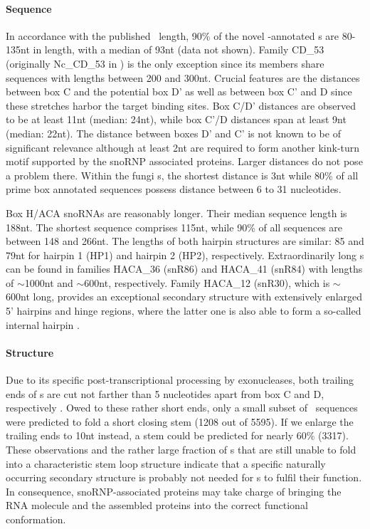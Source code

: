 \paragraph{\textbf{Sequence}}  In
accordance with the published \cd\ length, 90\% of the novel
\snostrip-annotated  \sno s are 80-135nt in length, with a median of 93nt (data not shown). 
Family CD\_53 (originally Nc\_CD\_53 in \cite{Joechl:2008}) is the only exception since its members share sequences with lengths between 200 and 300nt. 
Crucial features are the distances between box C
and the potential box D'  as well as between box C' and D
since these stretches harbor the target binding sites. 
Box C/D' distances are observed to be at least 11nt (median: 24nt), while box C'/D distances span at least 9nt (median: 22nt). 
The distance between boxes D' and C' is not known to be of significant relevance although at least 2nt are required to form another kink-turn motif supported by  the snoRNP associated proteins. 
Larger distances do not pose a problem there. 
Within the fungi \sno s, the shortest distance is 3nt while 80\% of all
prime box annotated sequences possess distance between 6 to 31
nucleotides.

Box H/ACA snoRNAs are reasonably longer. Their
median sequence length is 188nt. The shortest sequence comprises 115nt, while 90\% of all sequences are between 148 and 266nt. 
The lengths of both hairpin structures are similar: 85 and 79nt for hairpin 1 (HP1) and hairpin 2 (HP2), respectively. 
Extraordinarily long \sno s can be found in families HACA\_36 (snR86) and HACA\_41
(snR84) with lengths of $\sim$1000nt and $\sim$600nt,
respectively. Family HACA\_12 (snR30), which is $\sim$600nt long,
provides an exceptional secondary structure with extensively enlarged
5' hairpins and hinge regions, where the latter one is also able to
form a so-called internal hairpin \citep{Fayet-Lebaron:2009}. 

\paragraph{\textbf{Structure}} Due to its specific
post-transcriptional processing by exonucleases, both trailing ends of
\cd s are cut not farther than 5 nucleotides apart from box C and D,
respectively \citep{Kishore:2013}. Owed to these rather short ends,
only a small subset of \sno\ sequences were predicted to fold a short closing stem (1208 out of 5595). 
If we enlarge the trailing ends to 10nt instead, a stem could be predicted for nearly 60\% (3317). 
These observations and the rather large fraction of \sno s that are still unable to fold into a characteristic stem loop structure indicate that a specific naturally occurring secondary structure is probably not needed for \cd s to fulfil their function. 
In consequence, snoRNP-associated proteins may take charge of bringing the RNA molecule and the assembled proteins into the correct functional conformation.

